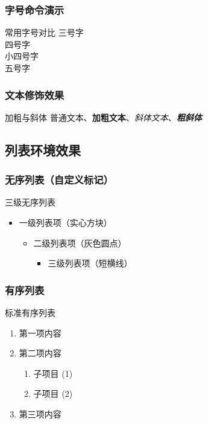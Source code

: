 \documentclass[linux]{hustreport}
\begin{document}
\subsubsection{字号命令演示}

\begin{democode}{常用字号对比}
{ 三号字} \\
{ 四号字} \\
{ 小四号字} \\
{ 五号字}
\end{democode}

\subsubsection{文本修饰效果}

\begin{democode}{加粗与斜体}
普通文本、\textbf{加粗文本}、\textit{斜体文本}、\textbf{\textit{粗斜体}}
\end{democode}

\subsection{列表环境效果}

\subsubsection{无序列表（自定义标记）}

\begin{demovert}{三级无序列表}
\begin{itemize}
    \item 一级列表项（实心方块）
    \begin{itemize}
        \item 二级列表项（灰色圆点）
        \begin{itemize}
            \item 三级列表项（短横线）
        \end{itemize}
    \end{itemize}
\end{itemize}
\end{demovert}

\subsubsection{有序列表}

\begin{demovert}{标准有序列表}
\begin{enumerate}
    \item 第一项内容
    \item 第二项内容
    \begin{enumerate}
        \item 子项目 (1)
        \item 子项目 (2)
    \end{enumerate}
    \item 第三项内容
\end{enumerate}
\end{demovert}
\end{document}
